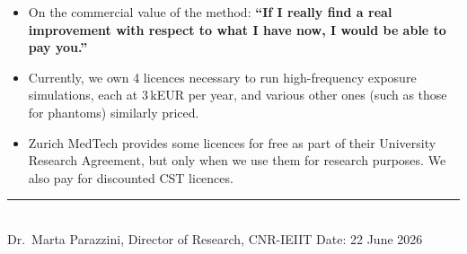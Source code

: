 \documentclass[11pt]{article}
\begin{document}
\begin{itemize}[leftmargin=1.4em,itemsep=0.5em]
  \item On the commercial value of the method: \textbf{``If I really find a real improvement
  with respect to what I have now, I would be able to pay you.''}

  \item Currently, we own 4 licences necessary to run high-frequency exposure simulations,
  each at 3\,kEUR per year, and various other ones (such as those for phantoms) similarly
  priced.

  \item Zurich MedTech provides some licences for free as part of their University Research
  Agreement, but only when we use them for research purposes. We also pay for discounted CST
  licences.

\end{itemize}

\vspace{1.5em}
\rule{6cm}{0.4pt}\\
Dr.\ Marta Parazzini, Director of Research, CNR-IEIIT \hfill Date: 22 June 2026
\end{document}
